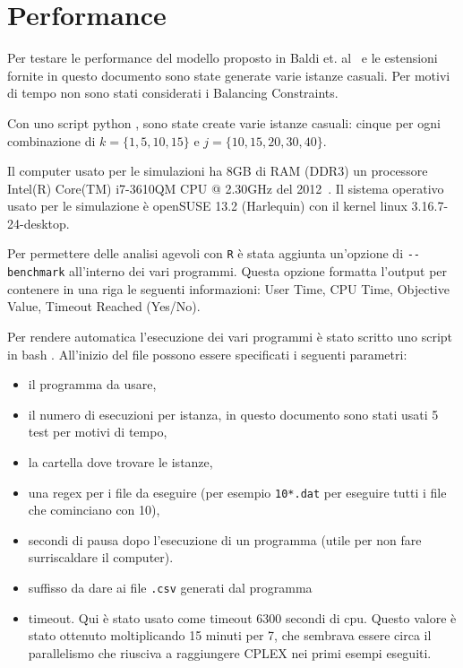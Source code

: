 \section{Performance}
\label{sec:benchmark}
Per testare le performance del modello proposto in Baldi et. 
al~\cite{Baldi20129802} e le estensioni fornite
in questo documento sono state generate varie istanze casuali.
Per motivi di tempo non sono stati considerati i Balancing Constraints. 

Con uno script python , sono state create varie
istanze casuali: cinque per ogni 
combinazione di $k = \{1,5,10,15\}$ e $j = \{10,15,20,30,40\}$. 

Il computer usato per le simulazioni ha 8GB di RAM (DDR3) un processore 
Intel(R) Core(TM) i7-3610QM CPU @ 2.30GHz del 2012~\cite{cpu}.
Il sistema operativo usato per le simulazione è openSUSE 13.2 (Harlequin) con
il kernel linux 3.16.7-24-desktop.

Per permettere delle analisi agevoli con \verb|R| è stata aggiunta un'opzione di
\verb|--benchmark| all'interno dei vari programmi. 
Questa opzione formatta l'output per contenere in una riga le seguenti 
informazioni: User Time, CPU Time, Objective Value, Timeout Reached (Yes/No).

Per rendere automatica l'esecuzione dei vari programmi è stato scritto uno 
script in bash . 
All'inizio del file possono essere specificati i seguenti parametri:
\begin{itemize}
\item il programma da usare, 
\item il numero di esecuzioni per istanza, in questo documento sono stati usati
5 test per motivi di tempo,
\item la cartella dove trovare le istanze, 
\item una regex per i file da eseguire  (per esempio \verb|10*.dat| per eseguire
 tutti i file che cominciano con 10), 
\item secondi di pausa dopo l'esecuzione di un programma 
(utile per non fare surriscaldare il computer).
\item suffisso da dare ai file \verb|.csv| generati dal programma
\item timeout. Qui è stato usato come timeout 6300 secondi di cpu. Questo valore
è stato ottenuto moltiplicando 15 minuti per 7, che sembrava essere
circa il parallelismo che riusciva a raggiungere CPLEX nei primi esempi eseguiti.
\end{itemize}

